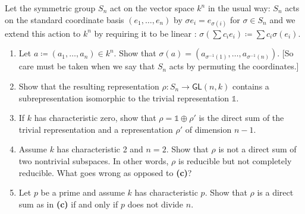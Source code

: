 \begin{problem}
Let the symmetric group $S_n$ act on the vector space $k^n$ in the usual way: $S_n$ acts on the standard coordinate basis $(e_1, \ldots, e_n)$ by $\sigma e_i=e_{\sigma(i)}$ for $\sigma \in S_n$ and we extend this action to $k^n$ by requiring it to be linear : $\sigma\left(\sum c_i e_i\right) \coloneqq \sum c_i \sigma(e_i)$.
\begin{enumerate}[font=\normalfont,label=\textbf{(\alph*)}]

\item Let $a \coloneqq (a_1, \ldots, a_n) \in k^n$. Show that $\sigma(a) = (a_{\sigma^{-1}(1)}, \ldots , a_{\sigma^{-1}(n)})$. [So care must be taken when we say that $S_n$ acts by permuting the coordinates.]

\item Show that the resulting representation $\rho: S_n \to \mathsf{GL}(n, k)$ contains a subrepresentation isomorphic to the trivial representation $\mathbb{1}$.
\item If $k$ has characteristic zero, show that $\rho = \mathbb{1} \oplus \rho'$ is the direct sum of the trivial representation and a representation $\rho'$ of dimension $n-1$.

\item Assume $k$ has characteristic 2 and $n = 2$. Show that $\rho$ is not a direct sum of two nontrivial subspaces. In other words, $\rho$ is reducible but not completely reducible. What goes wrong as opposed to \textbf{(c)}?

\item Let $p$ be a prime and assume $k$ has characteristic $p$. Show that $\rho$ is a direct sum as in \textbf{(c)} if and only if $p$ does not divide $n$.

\end{enumerate}
\end{problem}

